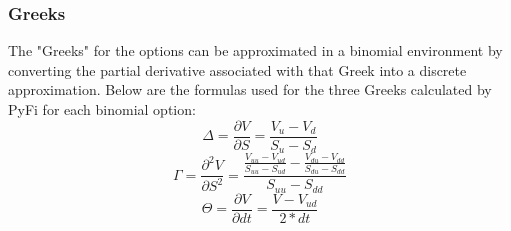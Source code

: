 \documentclass[10pt]{article}
\begin{document}
\subsubsection{Greeks}
The "Greeks" for the options can be approximated in a binomial environment by converting the partial
derivative associated with that Greek into a discrete approximation. Below are the formulas used for the
three Greeks calculated by PyFi for each binomial option:
    \begin{equation}
        \Delta = \frac{\partial V}{\partial S} = \frac{V_{u} - V_{d}}{S_{u} - S_{d}}
    \end{equation}
    \begin{equation}
        \Gamma = \frac{\partial^{2}V}{\partial S^2}
               = \frac{\frac{V_{uu}-V_{ud}}{S_{uu}-S_{ud}} - \frac{V_{du}-V_{dd}}{S_{du}-S_{dd}}}{S_{uu} - S_{dd}}
    \end{equation}
    \begin{equation}
        \Theta = \frac{\partial V}{\partial dt} = \frac{V - V_{ud}}{2*dt}
    \end{equation}
\end{document}
